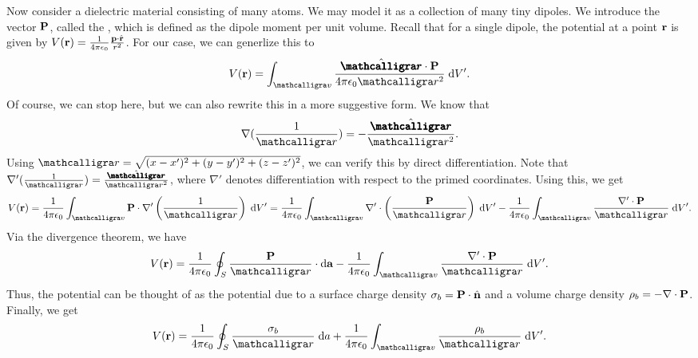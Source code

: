 Now consider a dielectric material consisting of many atoms. We may model it as a collection of many tiny dipoles. We introduce the vector $\mathbf{P}$, called the , which is defined as the dipole moment per unit volume. Recall that for a single dipole, the potential at a point $\mathbf{r}$ is given by $V(\mathbf{r}) = \frac{1}{4 \pi \epsilon_{0}} \frac{\mathbf{p} \cdot \hat{\mathbf{r}}}{r^{2}}$. For our case, we can generlize this to
\begin{align}
    V(\bv{r}) = \int_{\curs{v}} \frac{\hat{\bcurs{r}} \cdot \bv{P}}{4 \pi \epsilon_{0} \curs{r}^{2}} \; \di{V'}.
\end{align}
Of course, we can stop here, but we can also rewrite this in a more suggestive form. We know that
\begin{align}
    \nabla (\frac{1}{\curs{r}}) = - \frac{\hat{\bcurs{r}}}{\curs{r}^{2}}.
\end{align}
Using $\curs{r} = \sqrt{(x-x')^{2}+(y-y')^{2}+(z-z')^{2}}$, we can verify this by direct differentiation. Note that $\nabla ' (\frac{1}{\curs{r}}) = \frac{\hat{\bcurs{r}}}{\curs{r}^{2}}$, where $\nabla '$ denotes differentiation with respect to the primed coordinates. Using this, we get
\begin{align}
    V(\bv{r}) = \frac{1}{4 \pi \epsilon_{0}} \int_{\curs{v}} \bv{P} \cdot \nabla' \left( \frac{1}{\curs{r}} \right) \; \di{V'} = \frac{1}{4 \pi \epsilon_{0}} \int_{\curs{v}} \nabla' \cdot \left( \frac{\bv{P}}{\curs{r}} \right) \; \di{V'} - \frac{1}{4 \pi \epsilon_{0}} \int_{\curs{v}} \frac{\nabla' \cdot \bv{P}}{\curs{r}} \; \di{V'}.
\end{align}
Via the divergence theorem, we have
\begin{align}
    V(\bv{r}) = \frac{1}{4 \pi \epsilon_{0}} \oint_{S} \frac{\bv{P}}{\curs{r}} \cdot \di{\bv{a}} - \frac{1}{4 \pi \epsilon_{0}} \int_{\curs{v}} \frac{\nabla' \cdot \bv{P}}{\curs{r}} \; \di{V'}.
\end{align}
Thus, the potential can be thought of as the potential due to a surface charge density $\sigma_{b} = \mathbf{P} \cdot \hat{\mathbf{n}}$ and a volume charge density $\rho_{b} = -\nabla \cdot \mathbf{P}$. Finally, we get
\begin{align}
    V(\bv{r}) = \frac{1}{4 \pi \epsilon_{0}} \oint_{S} \frac{\sigma_{b}}{\curs{r}} \; \di{a} + \frac{1}{4 \pi \epsilon_{0}} \int_{\curs{v}} \frac{\rho_{b}}{\curs{r}} \; \di{V'}.
\end{align}


